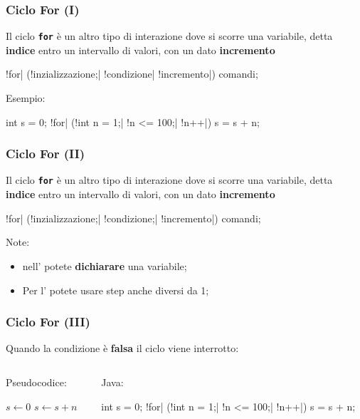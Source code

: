 \begin{frame}[fragile]\frametitle{Ciclo For (I)}
  Il ciclo \textbf{\texttt{for}} è un altro tipo di interazione dove si scorre una variabile,
  detta \textbf{indice} entro un intervallo di valori, con un dato \textbf{incremento}

  \begin{JavaCodePlain}[commandchars=\\!|]
    \Word!for| (\Blue!inzializzazione;| \Green!condizione| \Violet!incremento|) {
      comandi;
    }
  \end{JavaCodePlain}

  Esempio:
  \begin{JavaCodePlain}[commandchars=\\!|]
    int s = 0;
    \Word!for| (\Blue!int n = 1;| \Green!n <= 100;| \Violet!n++|) {
      s = s + n;
    }
  \end{JavaCodePlain}

\end{frame}

\begin{frame}[fragile]\frametitle{Ciclo For (II)}
  Il ciclo \textbf{\texttt{for}} è un altro tipo di interazione dove si scorre una variabile,
  detta \textbf{indice} entro un intervallo di valori, con un dato \textbf{incremento}

  \begin{JavaCodePlain}[commandchars=\\!|]
    \Word!for| (\Blue!inzializzazione;| \Green!condizione;| \Violet!incremento|) {
      comandi;
    }
  \end{JavaCodePlain}

  Note:
  \begin{itemize}
   \item nell'\texttt{} potete \textbf{dichiarare} una variabile;
   \item Per l'\texttt{} potete usare step anche diversi da 1;
  \end{itemize}

\end{frame}

\begin{frame}[fragile]\frametitle{Ciclo For (III)}
  Quando la condizione è \textbf{falsa} il ciclo viene interrotto:
  \begin{columns}[T]
    \begin{column}[T]{5cm}
      Pseudocodice:
      \begin{algorithmic}[1]     
	\State $s \gets 0$
	  \State $s \gets s + n$
	\EndFor
      \end{algorithmic}
    \end{column}
    \begin{column}[T]{6cm}
      Java:
      \begin{JavaCodePlain}[commandchars=\\!|]
	int s = 0;
	\Word!for| (\Blue!int n = 1;| \Green!n <= 100;| \Violet!n++|) {
	  s = s + n;
	}
      \end{JavaCodePlain}
    \end{column}
  \end{columns}
\end{frame}

